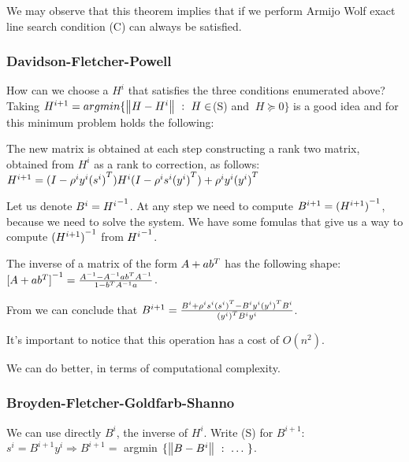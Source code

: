 \documentclass[computational_mathematics.tex]{subfiles}
\begin{document}
\begin{obs}
  We may observe that this theorem implies that if we perform Armijo Wolf exact line search condition (C) can always be satisfied.
\end{obs}

\subsubsection{Davidson-Fletcher-Powell}
How can we choose a $H^i$ that satisfies the three conditions enumerated above? Taking $H^{i+1} =argmin \{\left\lVert H - H^i\right\rVert~:~H \in$(S) and $ ~ H \succeq 0\}$ is a good idea and for this minimum problem holds the following:

\begin{theorem}
  The new matrix is obtained at each step constructing a rank two matrix, obtained from $H^i$ as a rank to correction, as follows:
  $H^{i+1} = (I - \rho^i y^i {(s^i)}^{T}) H^i(I - \rho^i s^i {(y^i)}^{T}) + \rho^i y^i {(y^i)}^{T}$
\end{theorem}

Let us denote $B^i = {H^i}^{-1}$.
At any step we need to compute $B^{i+1} = {(H^{i+1})}^{-1}$, because we need to solve the system. We have some fomulas that give us a way to compute ${(H^{i+1})}^{-1}$ from ${H^i}^{-1}$.

\begin{theorem}\label{theo:16novsmw}
  The inverse of a matrix of the form $A + a {b}^{T}$ has the following shape:
  ${[A + a {b}^{T}]}^{-1} = \frac{{A}^{-1} - {A}^{-1} a {b}^{T} {A}^{-1}}{1 - {b}^{T} {A}^{-1} a}$.
\end{theorem}

\begin{obs}
  From  we can conclude that $B^{i+1} = \frac{B^i + \rho^i s^i {(s^i)}^{T} - B^i y^i {(y^i)}^{T}B^i}{{(y^i)}^{T} B^i y^i}$.
\end{obs}
It's important to notice that this operation has a cost of $O(n^2)$.

We can do better, in terms of computational complexity.

\subsubsection{Broyden-Fletcher-Goldfarb-Shanno}

We can use directly $B^i$, the inverse of $H^i$.
Write (S) for $B^{i+1}$: $s^i = B^{i+1} y^i \Longrightarrow B^{i+1} =$ argmin $\{\left\lVert B - B^i\right\rVert~:~\ldots~ \}$.
\end{document}
